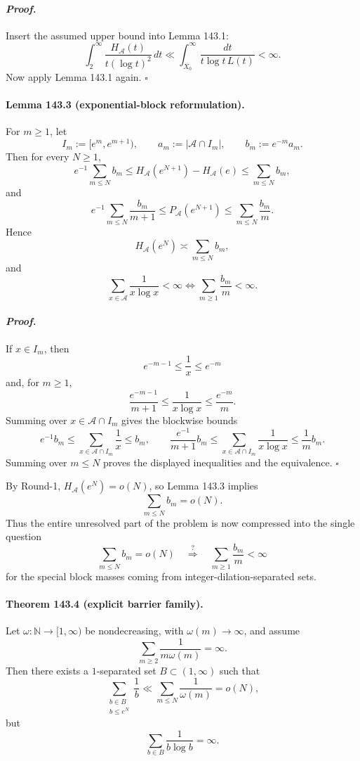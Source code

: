 \paragraph{\textit{Proof.}}
Insert the assumed upper bound into Lemma 143.1:
\[
\int_2^\infty \frac{H_{\mathcal A}(t)}{t(\log t)^2}\,dt
\ll
\int_{X_0}^\infty \frac{dt}{t\log t\,L(t)}<\infty.
\]
Now apply Lemma 143.1 again. \hfill $\square$

\paragraph{\textbf{Lemma 143.3 (exponential-block reformulation).}}
For $m\ge 1$, let
\[
I_m:=[e^m,e^{m+1}),\qquad
a_m:=|\mathcal A\cap I_m|,\qquad
b_m:=e^{-m}a_m.
\]
Then for every $N\ge 1$,
\[
e^{-1}\sum_{m\le N} b_m
\le
H_{\mathcal A}(e^{N+1})-H_{\mathcal A}(e)
\le
\sum_{m\le N} b_m,
\]
and
\[
e^{-1}\sum_{m\le N}\frac{b_m}{m+1}
\le
P_{\mathcal A}(e^{N+1})
\le
\sum_{m\le N}\frac{b_m}{m}.
\]
Hence
\[
H_{\mathcal A}(e^N)\asymp \sum_{m\le N} b_m,
\]
and
\[
\sum_{x\in\mathcal A}\frac{1}{x\log x}<\infty
\iff
\sum_{m\ge 1}\frac{b_m}{m}<\infty.
\]

\paragraph{\textit{Proof.}}
If $x\in I_m$, then
\[
e^{-m-1}\le \frac1x \le e^{-m}
\]
and, for $m\ge 1$,
\[
\frac{e^{-m-1}}{m+1}\le \frac{1}{x\log x}\le \frac{e^{-m}}{m}.
\]
Summing over $x\in \mathcal A\cap I_m$ gives the blockwise bounds
\[
e^{-1}b_m \le \sum_{x\in \mathcal A\cap I_m}\frac1x \le b_m,
\qquad
\frac{e^{-1}}{m+1}b_m \le \sum_{x\in \mathcal A\cap I_m}\frac{1}{x\log x}\le \frac1m b_m.
\]
Summing over $m\le N$ proves the displayed inequalities and the equivalence. \hfill $\square$

\medskip

By Round-1, $H_{\mathcal A}(e^N)=o(N)$, so Lemma 143.3 implies
\[
\sum_{m\le N} b_m=o(N).
\]
Thus the entire unresolved part of the problem is now compressed into the single question
\[
\sum_{m\le N}b_m=o(N)
\quad\stackrel{?}{\Longrightarrow}\quad
\sum_{m\ge 1}\frac{b_m}{m}<\infty
\]
for the special block masses coming from integer-dilation-separated sets.

\paragraph{\textbf{Theorem 143.4 (explicit barrier family).}}
Let $\omega:\mathbb N\to [1,\infty)$ be nondecreasing, with $\omega(m)\to\infty$, and assume
\[
\sum_{m\ge 2}\frac{1}{m\omega(m)}=\infty.
\]
Then there exists a $1$-separated set $B\subset (1,\infty)$ such that
\[
\sum_{\substack{b\in B\\ b\le e^N}}\frac1b
\ll
\sum_{m\le N}\frac{1}{\omega(m)}
=
o(N),
\]
but
\[
\sum_{b\in B}\frac{1}{b\log b}=\infty.
\]


